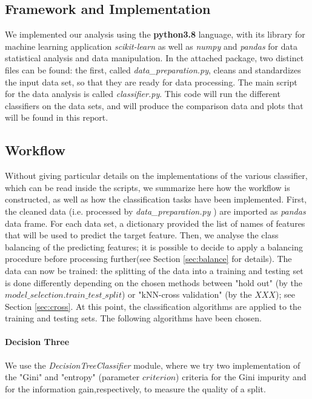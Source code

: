 \documentclass{article}
\begin{document}
\subsection{Framework and Implementation}
We implemented our analysis using the \textbf{python3.8} language, with its library for machine learning application \textit{scikit-learn} as well as \textit{numpy} and \textit{pandas} for data statistical analysis and data manipulation. In the attached package, two distinct files can be found: the first, called \textit{data\_preparation.py}, cleans and standardizes the input data set, so that they are ready for data processing. The main script for the data analysis is called \textit{classifier.py}. This code will run the different classifiers on the data sets, and will produce the comparison data and plots that will be found in this report.



\subsection{Workflow}
Without giving particular details on the implementations of the various classifier, which can be read inside the scripts, we summarize here how the workflow is constructed, as well as how the classification tasks have been implemented.
First, the cleaned data (i.e. processed by \textit{data\_preparation.py} ) are imported as \textit{pandas} data frame. For each data set, a dictionary provided the list of names of features that will be used to predict the target feature. Then, we analyse the class balancing of the predicting features; it is possible to decide to apply a balancing procedure before processing further(see Section \ref{sec:balance} for details). The data can now be trained: the splitting of the data into a training and testing set is done differently depending on the chosen methods between "hold out" (by the $model\_selection.train\_test\_split$)  or "kNN-cross validation" (by the $ XXX$); see Section \ref{sec:cross}.
At this point, the classification algorithms are applied to the training and testing sets. The following algorithms have been chosen.

\paragraph{Decision Three} We use the \textit{DecisionTreeClassifier} module, where we try two implementation of the "Gini" and "entropy" (parameter $criterion$) criteria for the Gini impurity and for the information gain,respectively, to measure the quality of a split.
\end{document}

